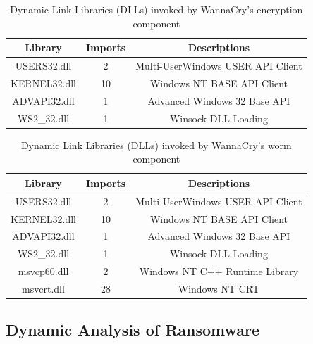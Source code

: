 \documentclass[12pt,letterpaper]{article}
\begin{document}
        \begin{table}[h]
            \centering
            \caption{Dynamic Link Libraries (DLLs) invoked by WannaCry's encryption component}
            \label{tab:DLL-Link File}
            \begin{tabular}{ccc}
                \toprule
                \textbf{Library} & \textbf{Imports} & \textbf{Descriptions} \\
                \midrule
                USERS32.dll & 2& Multi-UserWindows USER API Client\\
                KERNEL32.dll & 10& Windows NT BASE API Client\\
                ADVAPI32.dll & 1& Advanced Windows 32 Base API\\
                WS2\_32.dll & 1& Winsock DLL Loading\\
                \bottomrule
            \end{tabular}
        \end{table}

        \begin{table}[h]
            \centering
            \caption{Dynamic Link Libraries (DLLs) invoked by WannaCry's worm component}
            \label{tab:DLL-Link1 File}
            \begin{tabular}{ccc}
                \toprule
                \textbf{Library} & \textbf{Imports} & \textbf{Descriptions} \\
                \midrule
                USERS32.dll & 2& Multi-UserWindows USER API Client\\
                KERNEL32.dll & 10& Windows NT BASE API Client\\
                ADVAPI32.dll & 1& Advanced Windows 32 Base API\\
                WS2\_32.dll & 1& Winsock DLL Loading\\
                msvcp60.dll & 2 &  Windows NT C++ Runtime Library \\
                msvcrt.dll & 28 & Windows NT CRT \\
                \bottomrule
            \end{tabular}
        \end{table}


    \subsection{Dynamic Analysis of Ransomware}
\end{document}
